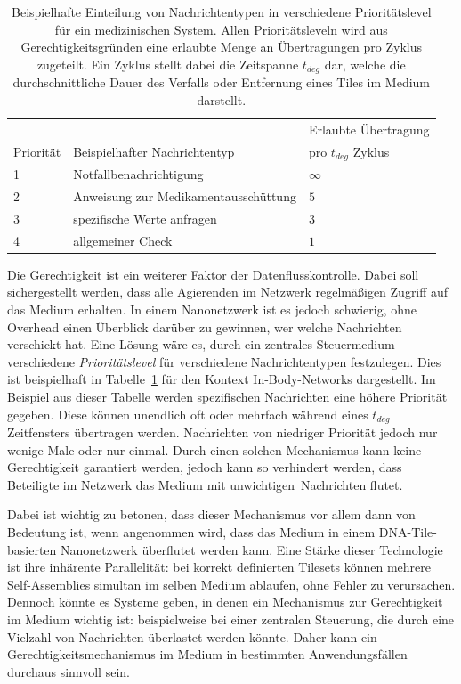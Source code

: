 \begin{table}
    \centering
    \begin{tabular}{l|l|l}
        & & Erlaubte Übertragung \\
        Priorität & Beispielhafter Nachrichtentyp & pro $t_{deg}$ Zyklus \\\hline 
        1 & Notfallbenachrichtigung & $\infty$ \\
        2 & Anweisung zur Medikamentausschüttung & $5$ \\
        3 & spezifische Werte anfragen & $3$ \\
        4 & allgemeiner Check & $1$
    \end{tabular}
    \caption[Prioritäten Beispiel]{Beispielhafte Einteilung von Nachrichtentypen in verschiedene Prioritätslevel für ein medizinischen System. Allen Prioritätsleveln wird aus Gerechtigkeitsgründen eine erlaubte Menge an Übertragungen pro Zyklus zugeteilt. Ein Zyklus stellt dabei die Zeitspanne $t_{deg}$ dar, welche die durchschnittliche Dauer des Verfalls oder Entfernung eines Tiles im Medium darstellt.}
    \label{tab:prio_gerechtigkeit}
\end{table}

Die Gerechtigkeit ist ein weiterer Faktor der Datenflusskontrolle. Dabei soll sichergestellt werden, dass alle Agierenden im Netzwerk regelmäßigen Zugriff auf das Medium erhalten. In einem Nanonetzwerk ist es jedoch schwierig, ohne Overhead einen Überblick darüber zu gewinnen, wer welche Nachrichten verschickt hat. Eine Lösung wäre es, durch ein zentrales Steuermedium verschiedene \emph{Prioritätslevel} für verschiedene Nachrichtentypen festzulegen. Dies ist beispielhaft in Tabelle~\ref{tab:prio_gerechtigkeit} für den Kontext In-Body-Networks dargestellt. Im Beispiel aus dieser Tabelle werden spezifischen Nachrichten eine höhere Priorität gegeben. Diese können unendlich oft oder mehrfach während eines $t_{deg}$ Zeitfensters übertragen werden. Nachrichten von niedriger Priorität jedoch nur wenige Male oder nur einmal. Durch einen solchen Mechanismus kann keine Gerechtigkeit garantiert werden, jedoch kann so verhindert werden, dass Beteiligte im Netzwerk das Medium mit \glqq unwichtigen\grqq\, Nachrichten flutet.

Dabei ist wichtig zu betonen, dass dieser Mechanismus vor allem dann von Bedeutung ist, wenn angenommen wird, dass das Medium in einem DNA-Tile-basierten Nanonetzwerk überflutet werden kann. Eine Stärke dieser Technologie ist ihre inhärente Parallelität: bei korrekt definierten Tilesets können mehrere Self-Assemblies simultan im selben Medium ablaufen, ohne Fehler zu verursachen. Dennoch könnte es Systeme geben, in denen ein Mechanismus zur Gerechtigkeit im Medium wichtig ist: beispielweise bei einer zentralen Steuerung, die durch eine Vielzahl von Nachrichten überlastet werden könnte. Daher kann ein Gerechtigkeitsmechanismus im Medium in bestimmten Anwendungsfällen durchaus sinnvoll sein.

